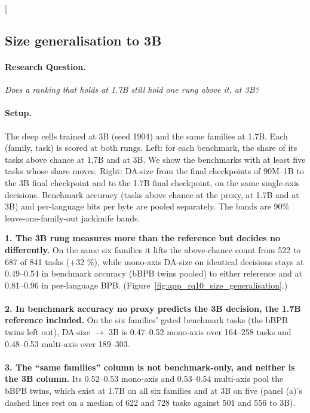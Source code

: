 \clearpage
\twocolumn[{%
\subsection{Size generalisation to 3B}
\label{app:rq10_size_generalisation}

\noindent\begin{minipage}[t]{0.485\textwidth}
\vspace{0pt}
\paragraph{Research Question.} \emph{Does a ranking that holds at 1.7B still hold one rung above it, at 3B?}

\paragraph{Setup.} The deep cells trained at 3B (seed 1904) and the same families at 1.7B. Each (family, task) is scored at both rungs. Left: for each benchmark, the share of its tasks above chance at 1.7B and at 3B. We show the benchmarks with at least five tasks whose share moves. Right: DA-size from the final checkpoints of 90M--1B to the 3B final checkpoint and to the 1.7B final checkpoint, on the same single-axis decisions. Benchmark accuracy (tasks above chance at the proxy, at 1.7B and at 3B) and per-language bits per byte are pooled separately. The bands are 90\% leave-one-family-out jackknife bands.
\end{minipage}\hfill
\begin{minipage}[t]{0.485\textwidth}
\vspace{0pt}
\begin{rqfinding}
\textbf{1. The 3B rung measures more than the reference but decides no differently.} On the same six families it lifts the above-chance count from 522 to 687 of 841 tasks (+32 \%), while mono-axis DA-size on identical decisions stays at 0.49--0.54 in benchmark accuracy (bBPB twins pooled) to either reference and at 0.81--0.96 in per-language BPB. (Figure~\ref{fig:app_rq10_size_generalisation}.)
\\
\\
\textbf{2. In benchmark accuracy no proxy predicts the 3B decision, the 1.7B reference included.} On the six families' gated benchmark tasks (the bBPB twins left out), DA-size $\rightarrow$ 3B is 0.47--0.52 mono-axis over 164--258 tasks and 0.48--0.53 multi-axis over 189--303.
\\
\\
\textbf{3. The ``same families'' column is not benchmark-only, and neither is the 3B column.} Its 0.52--0.53 mono-axis and 0.53--0.54 multi-axis pool the bBPB twins, which exist at 1.7B on all six families and at 3B on five (panel (a)'s dashed lines rest on a median of 622 and 728 tasks against 501 and 556 to 3B).
\end{rqfinding}
\end{minipage}

}

